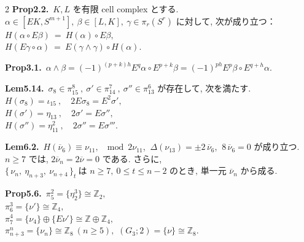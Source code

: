 \documentclass[10pt, leqno]{ltjsarticle}
\newcommand{\todai}[2][]{\{\,#2\,\}_{#1}}      %
\newcommand{\gen}[1]{\{#1\}}       %
\numberwithin{equation}{section}
\theoremstyle{plain}
\theoremstyle{definition}
\theoremstyle{remark}
\begin{document}
\begin{paracol}{2}
\noindent
\textbf{Prop2.2.}\
$K,L$ を有限 cell complex とする. \\
$\alpha\in[EK, S^{m+1}], \ \beta\in[L,K], \ \gamma\in\pi_r(S^r)$ 
に対して, 次が成り立つ：\\
\(
H(\alpha\circ E\beta)\ =\ H(\alpha)\circ E\beta,
\)\\
\(
H(E\gamma\circ\alpha)\ =\ E(\gamma\wedge\gamma)\circ H(\alpha).
\)

\noindent
\textbf{Prop3.1.}\
\(
\alpha \wedge \beta
= (-1)^{(p+k)h} E^{q}\alpha \circ E^{p+k}\beta
= (-1)^{ph} E^{p}\beta \circ E^{q+h}\alpha .
\)

\noindent
\textbf{Lem5.14.}\
\(\sigma_{8}\in\pi^{8}_{15}\ , \ \sigma'\in\pi^{7}_{14}\ , \ \sigma''\in\pi^{6}_{13}\) 
が存在して, 次を満たす. \\
\(H(\sigma_{8})=\iota_{15} \ ,\quad 2E\sigma_{8}=E^{2}\sigma',\)\\
\(H(\sigma')=\eta_{13} \ ,\quad 2\sigma'=E\sigma'',\)\\
\(H(\sigma'')=\eta_{11}^2 \ ,\quad 2\sigma''=E\sigma''' .\)

\noindent
\textbf{Lem6.2.}\
\(H(\overline{\nu}_6)\equiv\nu_{11},\ \mod 2\nu_{11}\text{}\), 
\(\ \Delta(\nu_{13})=\pm 2\,\overline{\nu}_6\), 
\(\ 8\,\overline{\nu}_6=0\) が成り立つ. \\
\(n\ge7\) では,
\(2\overline{\nu}_n=2\overline{\nu}=0\) である. さらに,\\
\(
\todai[t]{\nu_n,\ \eta_{n+3},\ \nu_{n+4}}\ \text{は }n\ge7,\ 
0\le t\le n-2\text{ のとき, 単一元 }\overline{\nu}_n\text{ から成る. }
\)

\noindent
\textbf{Prop5.6.}\
\(\pi^{2}_{5}=\gen{\eta_{2}^{3}}\cong \mathbb Z_{2},\) \\
\(\pi^{3}_{6}=\gen{\nu'}\cong \mathbb Z_{4},\) \\
\(\pi^{4}_{7}=\gen{\nu_{4}}\oplus \gen{E\nu'}\cong \mathbb Z\oplus\mathbb Z_{4},\) \\
\(\pi^{n}_{n+3}=\gen{\nu_{n}}\cong \mathbb Z_{8}\ (n\ge5),\)\qquad
\((G_{3};2)=\gen{\nu}\cong \mathbb Z_{8}.\)





\end{paracol}
\end{document}
